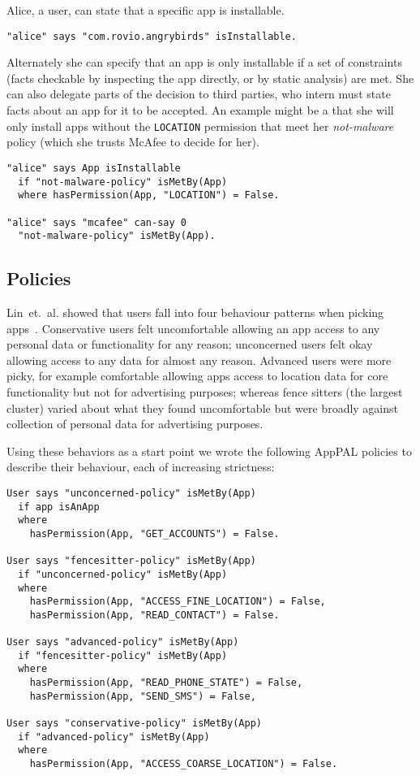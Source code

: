 \documentclass[twocolumn,letterpaper]{soups-poster}
\newcommand{\etal}[0]{et{.}~al{.}}
\newcommand{\citep}[1]{\cite{#1}}
\begin{document}
Alice, a user, can state that a specific app is installable.
\begin{lstlisting}
"alice" says "com.rovio.angrybirds" isInstallable.
\end{lstlisting}
Alternately she can specify that an app is only installable if a set of
constraints (facts checkable by inspecting the app directly, or by static
analysis) are met.
She can also delegate parts of the decision to third parties, who intern must
state facts about an app for it to be accepted.  An example might be a
that she will only install apps without the \texttt{LOCATION} permission
that meet her \emph{not-malware} policy (which she trusts McAfee to decide for
her).
\begin{lstlisting}
"alice" says App isInstallable
  if "not-malware-policy" isMetBy(App)
  where hasPermission(App, "LOCATION") = False.

"alice" says "mcafee" can-say 0
  "not-malware-policy" isMetBy(App).
\end{lstlisting}

\subsection{Policies}

Lin~\etal{} showed that users fall into four behaviour patterns when picking
apps~\citep{Sadeh:2014vq}.  Conservative users felt uncomfortable allowing an
app access to any personal data or functionality for any reason; unconcerned
users felt okay allowing access to any data for almost any reason.  Advanced
users were more picky, for example comfortable allowing apps access to location data for core
functionality but not for advertising purposes; whereas fence sitters (the
largest cluster) varied about what they found uncomfortable but were broadly
against collection of personal data for advertising purposes.

Using these behaviors as a start point we wrote the following AppPAL policies to
describe their behaviour, each of increasing strictness:
\begin{lstlisting}
User says "unconcerned-policy" isMetBy(App)
  if app isAnApp
  where 
    hasPermission(App, "GET_ACCOUNTS") = False.
        
User says "fencesitter-policy" isMetBy(App)
  if "unconcerned-policy" isMetBy(App)
  where 
    hasPermission(App, "ACCESS_FINE_LOCATION") = False,
    hasPermission(App, "READ_CONTACT") = False.

User says "advanced-policy" isMetBy(App)
  if "fencesitter-policy" isMetBy(App)
  where 
    hasPermission(App, "READ_PHONE_STATE") = False,
    hasPermission(App, "SEND_SMS") = False,

User says "conservative-policy" isMetBy(App)
  if "advanced-policy" isMetBy(App)
  where 
    hasPermission(App, "ACCESS_COARSE_LOCATION") = False.
\end{lstlisting}
\end{document}
